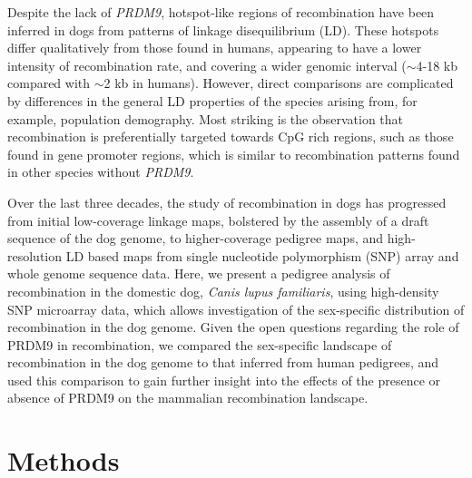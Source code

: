 Despite the lack of \textit{PRDM9}, hotspot-like regions of recombination have been inferred in dogs from patterns of linkage disequilibrium (LD).
These hotspots differ qualitatively from those found in humans, appearing to have a lower intensity of recombination rate, and covering a wider genomic interval ($\sim$4-18 kb compared with $\sim$2 kb in humans)\cite{Axelsson2012,Auton2013}.
However, direct comparisons are complicated by differences in the general LD properties of the species arising from, for example, population demography\cite{Auton2013}.
Most striking is the observation that recombination is preferentially targeted towards CpG rich regions, such as those found in gene promoter regions,
which is similar to recombination patterns found in other species without \textit{PRDM9}.



Over the last three decades, the study of recombination in dogs has progressed from initial low-coverage linkage maps\cite{Mellersh1997,Neff1999}, bolstered by the assembly of a draft sequence of the dog genome\cite{Lindblad-Toh2005}, to higher-coverage pedigree maps\cite{Wong2010}, and high-resolution LD based maps from single nucleotide polymorphism (SNP) array and whole genome sequence data\cite{Axelsson2012,Auton2013}.
Here, we present a pedigree analysis of recombination in the domestic dog, \textit{Canis lupus familiaris}, using high-density SNP microarray data, which allows investigation of the sex-specific distribution of recombination in the dog genome.
Given the open questions regarding the role of PRDM9 in recombination, we compared the sex-specific landscape of recombination in the dog genome to that inferred from human pedigrees, and used this comparison to gain further insight into the effects of the presence or absence of PRDM9 on the mammalian recombination landscape.

\section{Methods}

